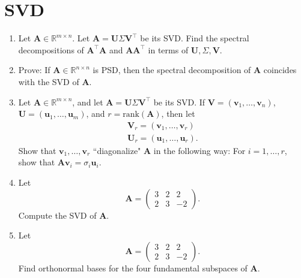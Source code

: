 \documentclass{article}
\begin{document}
\section{SVD}
\begin{enumerate}[label=(\alph*)]
\item Let $\textbf{A} \in \mathbb{R}^{m \times n}$. Let $\textbf{A} = \textbf{U}\Sigma\textbf{V}^\top$ be its SVD. Find the spectral decompositions of $\textbf{A}^\top\textbf{A}$ and $\textbf{A}\textbf{A}^\top$ in terms of $\textbf{U}, \Sigma, \textbf{V}$.
\item Prove: If $\textbf{A} \in \mathbb{R}^{n \times n}$ is PSD, then the spectral decomposition of $\textbf{A}$ coincides with the SVD of $\textbf{A}$.
\item Let $\textbf{A} \in \mathbb{R}^{m \times n}$, and let $\textbf{A} = \textbf{U}\Sigma\textbf{V}^\top$ be its SVD. If $\textbf{V} = (\textbf{v}_1, \hdots, \textbf{v}_n)$, $\textbf{U} = (\textbf{u}_1, \hdots, \textbf{u}_m)$, and $r = \text{rank}(\textbf{A})$, then let
\begin{gather*}
\textbf{V}_r = (\textbf{v}_1, \hdots, \textbf{v}_r) \\
\textbf{U}_r = (\textbf{u}_1, \hdots, \textbf{u}_r).
\end{gather*}  
Show that $\textbf{v}_1, \hdots, \textbf{v}_r$ ``diagonalize" $\textbf{A}$ in the following way: For $i = 1,\hdots, r$, show that $\textbf{A}\textbf{v}_i = \sigma_i\textbf{u}_i$.
\item Let 
\[
\textbf{A} = \begin{pmatrix}
3 & 2 & 2 \\
2 & 3 & -2
\end{pmatrix}.
\]
Compute the SVD of $\textbf{A}$.

\item Let 
\[
\textbf{A} = \begin{pmatrix}
3 & 2 & 2 \\
2 & 3 & -2
\end{pmatrix}.
\]
Find orthonormal bases for the four fundamental subspaces of $\textbf{A}$.
\end{enumerate}
\end{document}
